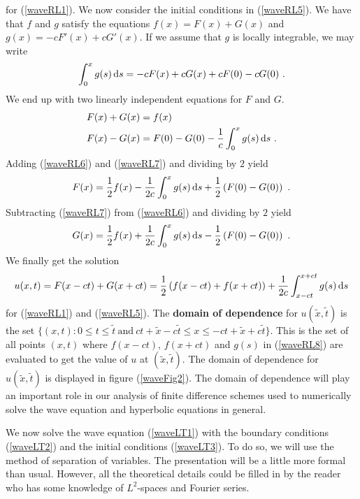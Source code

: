 for (\ref{waveRL1}).  We now consider the initial conditions in
(\ref{waveRL5}).  We have that $f$ and $g$ satisfy the equations
$f(x) = F(x) + G(x)$ and $g(x) = -c F'(x) + c G'(x)$.
If we assume that $g$ is locally integrable, we may write
\[
\int_0^x g(s)\,\mathrm{d}s = -c F(x) + c G(x) + c F(0) - c G(0) \ .
\]
We end up with two linearly independent equations for $F$ and $G$.
\begin{align}
F(x) + G(x) &= f(x) \label{waveRL6} \\
F(x) - G(x) &= F(0) - G(0) -\frac{1}{c} \int_0^x g(s)\,\mathrm{d}s \ . \label{waveRL7}
\end{align}
Adding (\ref{waveRL6}) and (\ref{waveRL7}) and dividing by $2$ yield
\[
F(x) = \frac{1}{2} f(x) - \frac{1}{2c} \int_0^x g(s)\,\mathrm{d}s +
\frac{1}{2} \left(F(0) - G(0)\right) \ .
\]
Subtracting (\ref{waveRL7}) from (\ref{waveRL6}) and dividing by $2$
yield
\[
G(x) = \frac{1}{2} f(x) + \frac{1}{2c} \int_0^x g(s)\,\mathrm{d}s -
\frac{1}{2} \left(F(0) - G(0)\right) \ .
\]
We finally get the solution
\begin{equation} \label{waveRL8}
u(x,t) = F(x-ct) + G(x+ct)
= \frac{1}{2} \left(f(x-ct) + f(x+ct)\right)
+ \frac{1}{2c} \int_{x-ct}^{x+ct} g(s)\,\mathrm{d}s
\end{equation}
for (\ref{waveRL1}) and (\ref{waveRL5}).  The
{\bfseries domain of dependence}
for $u(\tilde{x},\tilde{t})$ is the set 
$\{ (x,t) :  0 \leq t \leq \tilde{t} \ \text{and}
\ ct + \tilde{x} - c\tilde{t} \leq x \leq -ct + \tilde{x} + c\tilde{t} \}$.
This is the set of all points $(x,t)$ where $f(x-ct)$, $f(x+ct)$ and
$g(s)$ in (\ref{waveRL8}) are evaluated to get the value of 
$u$ at $(\tilde{x},\tilde{t})$.
The domain of dependence for $u(\tilde{x},\tilde{t})$ 
is displayed in figure (\ref{waveFig2}).  The domain of dependence
will play an important role in our analysis of finite difference
schemes used to numerically solve the wave equation and hyperbolic
equations in general. 


We now solve the wave equation (\ref{waveLT1}) with the boundary
conditions (\ref{waveLT2}) and the initial conditions (\ref{waveLT3}).
To do so, we will use the method of separation of variables.
The presentation will be a little more formal than usual.  However,
all the theoretical details could be filled in by the reader who has some
knowledge of $L^2$-spaces and Fourier series.

